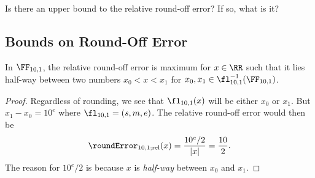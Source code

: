 \begin{puzzle}
Is there an upper bound to the relative round-off error? If so, what is it?
\end{puzzle}

\subsection{Bounds on Round-Off Error}


\begin{lemma}
In $\FF_{10,1}$, the relative round-off error is maximum for $x\in\RR$
such that it lies half-way between two numbers $x_{0}<x<x_{1}$ for
$x_{0},x_{1}\in\fl_{10,1}^{-1}(\FF_{10,1})$.
\end{lemma}
\begin{proof}
Regardless of rounding, we see that $\fl_{10,1}(x)$ will be either
$x_{0}$ or $x_{1}$. But $x_{1}-x_{0}=10^{e}$ where $\fl_{10,1}=(s,m,e)$.
The relative round-off error would then be
\begin{equation}
  \roundError_{10,1;\text{rel}}(x) = \frac{10^{e}/2}{|x|} = \frac{10}{2}.
\end{equation}
The reason for $10^{e}/2$ is because $x$ is \emph{half-way} between
$x_{0}$ and $x_{1}$.
\end{proof}

